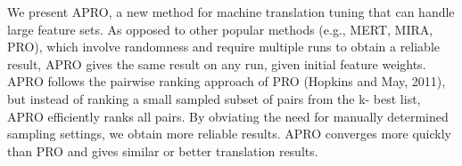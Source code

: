 We present APRO, a new method for machine translation tuning that can handle large feature sets. As opposed to other popular methods (e.g., MERT, MIRA, PRO), which involve randomness and require multiple runs to obtain a reliable result, APRO gives the same result on any run, given initial feature weights. APRO follows the pairwise ranking approach of PRO (Hopkins and May, 2011), but instead of ranking a small sampled subset of pairs from the k- best list, APRO efficiently ranks all pairs. By obviating the need for manually determined sampling settings, we obtain more reliable results. APRO converges more quickly than PRO and gives similar or better translation results.
